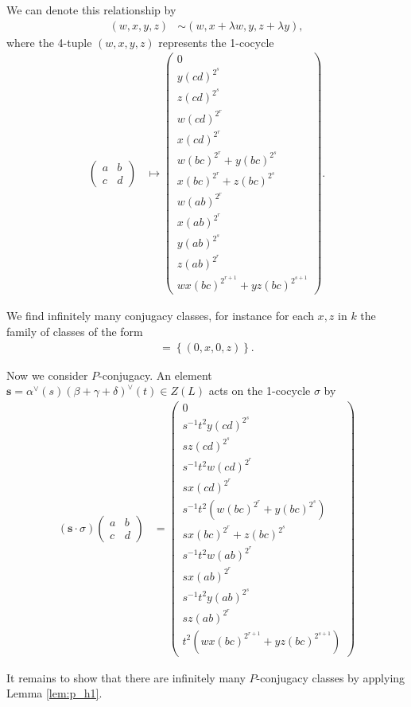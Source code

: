 We can denote this relationship by
\begin{align*}
(w,x,y,z) &\sim (w, x+\lambda w, y, z + \lambda y),
\end{align*}
where the 4-tuple $(w,x,y,z)$ represents the 1-cocycle 
\begin{align*}
\left(\begin{matrix} a & b \\ c & d \end{matrix}\right) &\mapsto
\left(\begin{matrix}
0 \\
y(cd)^{2^s} \\
z(cd)^{2^s} \\
w(cd)^{2^r} \\
x(cd)^{2^r} \\
w(bc)^{2^r} + y(bc)^{2^s} \\
x(bc)^{2^r} + z(bc)^{2^s} \\
w(ab)^{2^r} \\
x(ab)^{2^r}  \\
y(ab)^{2^s} \\
z(ab)^{2^r} \\
wx(bc)^{2^{r+1}} + yz(bc)^{2^{s+1}}
\end{matrix}\right).
\end{align*}

We find infinitely many conjugacy classes, for instance for each $x, z$ in $k$ the family of classes of the form
\begin{align*}
[(0,x,0,z)] = \left\{(0,x,0,z)\right\}.
\end{align*}

Now we consider $P$-conjugacy. An element $\mathbf{s} = \alpha^\vee(s)(\beta + \gamma + \delta)^\vee(t)\in Z(L)$ acts on the 1-cocycle $\sigma$ by
\begin{align*}
(\mathbf{s}\cdot\sigma)\left(\begin{matrix} a & b \\ c & d\end{matrix}\right)
&=
\left(\begin{matrix}
0 \\
s^{-1}t^{2}y(cd)^{2^s} \\
sz(cd)^{2^s} \\
s^{-1}t^{2}w(cd)^{2^r} \\
sx(cd)^{2^r} \\
s^{-1}t^{2}(w(bc)^{2^r} + y(bc)^{2^s}) \\
sx(bc)^{2^r} + z(bc)^{2^s} \\
s^{-1}t^{2}w(ab)^{2^r} \\
sx(ab)^{2^r}  \\
s^{-1}t^{2}y(ab)^{2^s} \\
sz(ab)^{2^r} \\
t^2(wx(bc)^{2^{r+1}} + yz(bc)^{2^{s+1}})
\end{matrix}\right)
\end{align*}

It remains to show that there are infinitely many $P$-conjugacy classes by applying Lemma \ref{lem:p_h1}.

